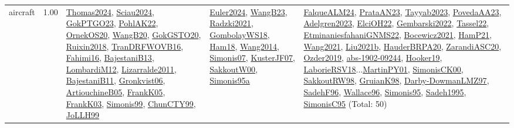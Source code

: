 {\begin{longtable}{p{3cm}r>{\raggedright\arraybackslash}p{6cm}>{\raggedright\arraybackslash}p{6cm}>{\raggedright\arraybackslash}p{8cm}}
\index{aircraft}\index{ApplicationAreas!aircraft}aircraft &  1.00 & \hyperref[detail:Thomas2024]{Thomas2024}, \hyperref[detail:Sciau2024]{Sciau2024}, \hyperref[detail:GokPTGO23]{GokPTGO23}, \hyperref[detail:PohlAK22]{PohlAK22}, \hyperref[detail:OrnekOS20]{OrnekOS20}, \hyperref[detail:WangB20]{WangB20}, \hyperref[detail:GokGSTO20]{GokGSTO20}, \hyperref[detail:Ruixin2018]{Ruixin2018}, \hyperref[detail:TranDRFWOVB16]{TranDRFWOVB16}, \hyperref[detail:Fahimi16]{Fahimi16}, \hyperref[detail:BajestaniB13]{BajestaniB13}, \hyperref[detail:LombardiM12]{LombardiM12}, \hyperref[detail:Lizarralde2011]{Lizarralde2011}, \hyperref[detail:BajestaniB11]{BajestaniB11}, \hyperref[detail:Gronkvist06]{Gronkvist06}, \hyperref[detail:ArtiouchineB05]{ArtiouchineB05}, \hyperref[detail:FrankK05]{FrankK05}, \hyperref[detail:FrankK03]{FrankK03}, \hyperref[detail:Simonis99]{Simonis99}, \hyperref[detail:ChunCTY99]{ChunCTY99}, \hyperref[detail:JoLLH99]{JoLLH99} & \hyperref[detail:Euler2024]{Euler2024}, \hyperref[detail:WangB23]{WangB23}, \hyperref[detail:Radzki2021]{Radzki2021}, \hyperref[detail:GombolayWS18]{GombolayWS18}, \hyperref[detail:Ham18]{Ham18}, \hyperref[detail:Wang2014]{Wang2014}, \hyperref[detail:Simonis07]{Simonis07}, \hyperref[detail:KusterJF07]{KusterJF07}, \hyperref[detail:SakkoutW00]{SakkoutW00}, \hyperref[detail:Simonis95a]{Simonis95a} & \hyperref[detail:FalqueALM24]{FalqueALM24}, \hyperref[detail:PrataAN23]{PrataAN23}, \hyperref[detail:Tayyab2023]{Tayyab2023}, \hyperref[detail:PovedaAA23]{PovedaAA23}, \hyperref[detail:Adelgren2023]{Adelgren2023}, \hyperref[detail:ElciOH22]{ElciOH22}, \hyperref[detail:Gembarski2022]{Gembarski2022}, \hyperref[detail:Tassel22]{Tassel22}, \hyperref[detail:EtminaniesfahaniGNMS22]{EtminaniesfahaniGNMS22}, \hyperref[detail:Bocewicz2021]{Bocewicz2021}, \hyperref[detail:HamP21]{HamP21}, \hyperref[detail:Wang2021]{Wang2021}, \hyperref[detail:Liu2021b]{Liu2021b}, \hyperref[detail:HauderBRPA20]{HauderBRPA20}, \hyperref[detail:ZarandiASC20]{ZarandiASC20}, \hyperref[detail:Ozder2019]{Ozder2019}, \hyperref[detail:abs-1902-09244]{abs-1902-09244}, \hyperref[detail:Hooker19]{Hooker19}, \hyperref[detail:LaborieRSV18]{LaborieRSV18}...\hyperref[detail:MartinPY01]{MartinPY01}, \hyperref[detail:SimonisCK00]{SimonisCK00}, \hyperref[detail:SakkoutRW98]{SakkoutRW98}, \hyperref[detail:GruianK98]{GruianK98}, \hyperref[detail:Darby-DowmanLMZ97]{Darby-DowmanLMZ97}, \hyperref[detail:SadehF96]{SadehF96}, \hyperref[detail:Wallace96]{Wallace96}, \hyperref[detail:Simonis95]{Simonis95}, \hyperref[detail:Sadeh1995]{Sadeh1995}, \hyperref[detail:SimonisC95]{SimonisC95} (Total: 50)\\

\end{longtable}}
